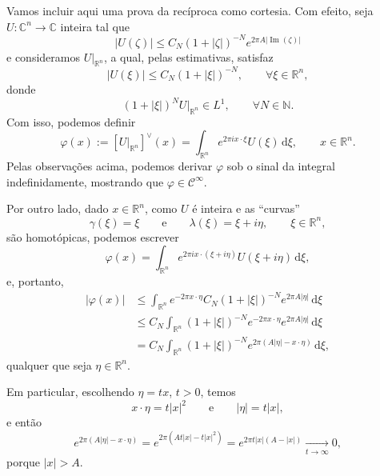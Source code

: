 \documentclass[../distribution_theory_notes.tex]{subfiles}
\begin{document}
\begin{proof*}
	Vamos incluir aqui uma prova da recíproca como cortesia. Com efeito, seja \(U:\mathbb{C}^n\to\mathbb{C}\) inteira tal que
	\[
		|U(\zeta)|\leq C_N(1+|\zeta|)^{-N}e^{2\pi A|\operatorname{Im}(\zeta)|}
	\]
	e consideramos \(U|_{\mathbb{R}^n}\), a qual, pelas estimativas, satisfaz
	\[
		|U(\xi)|\leq C_N(1+|\xi|)^{-N},
		\qquad \forall \xi\in\mathbb{R}^n,
	\]
	donde
	\[
		(1+|\xi|)^N U|_{\mathbb{R}^n}\in L^1,
		\qquad \forall N\in\mathbb{N}.
	\]
	Com isso, podemos definir
	\[
		\varphi(x):=[U|_{\mathbb{R}^n}]^\vee(x)
		=\int_{\mathbb{R}^n}e^{2\pi i x\cdot\xi}U(\xi)\,\mathrm{d}\xi,
		\qquad x\in\mathbb{R}^n.
	\]
	Pelas observações acima, podemos derivar \(\varphi\) sob o sinal da integral indefinidamente, mostrando que \(\varphi\in\mathcal{C}^\infty\).

	Por outro lado, dado \(x\in\mathbb{R}^n\), como \(U\) é inteira e as ``curvas''
	\[
		\gamma(\xi)=\xi
		\qquad\text{e}\qquad
		\lambda(\xi)=\xi+i\eta,
		\qquad \xi\in\mathbb{R}^n,
	\]
	são homotópicas, podemos escrever
	\[
		\varphi(x)=\int_{\mathbb{R}^n}e^{2\pi i x\cdot(\xi+i\eta)}U(\xi+i\eta)\,\mathrm{d}\xi,
	\]
	e, portanto,
	\begin{align*}
		|\varphi(x)|
		 & \leq\int_{\mathbb{R}^n}e^{-2\pi x\cdot\eta}
		C_N(1+|\xi|)^{-N}e^{2\pi A|\eta|}\,\mathrm{d}\xi    \\
		 & \leq C_N\int_{\mathbb{R}^n}(1+|\xi|)^{-N}
		e^{-2\pi x\cdot\eta}e^{2\pi A|\eta|}\,\mathrm{d}\xi \\
		 & =C_N\int_{\mathbb{R}^n}(1+|\xi|)^{-N}
		e^{2\pi(A|\eta|-x\cdot\eta)}\,\mathrm{d}\xi,
	\end{align*}
	qualquer que seja \(\eta\in\mathbb{R}^n\).

	Em particular, escolhendo \(\eta=tx\), \(t>0\), temos
	\[
		x\cdot\eta=t|x|^2
		\qquad\text{e}\qquad
		|\eta|=t|x|,
	\]
	e então
	\[
		e^{2\pi(A|\eta|-x\cdot\eta)}
		=e^{2\pi(At|x|-t|x|^2)}
		=e^{2\pi t|x|(A-|x|)}
		\underset{t\to\infty}{\longrightarrow}0,
	\]
	porque \(|x|>A\). \qedsymbol
\end{proof*}
\end{document}

